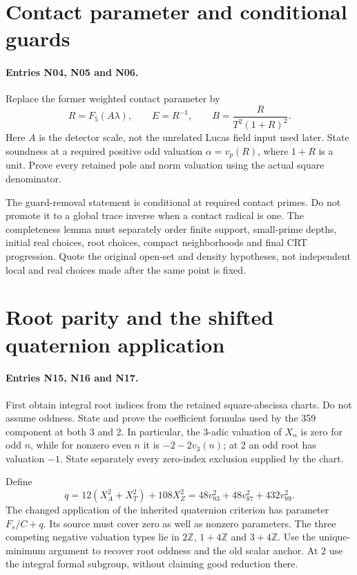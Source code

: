 \documentclass{article}
\begin{document}
\section{Contact parameter and conditional guards}
\label{outline:contact}
\paragraph{Entries N04, N05 and N06.}
Replace the former weighted contact parameter by
\[
 R=F_5(A\lambda),\qquad E=R^{-1},\qquad
 B=\frac{R}{T^2(1+R)^2}.
\]
Here $A$ is the detector scale, not the unrelated Lucas field input
used later. State soundness at a required positive odd valuation
$\alpha=v_p(R)$, where $1+R$ is a unit. Prove every retained pole and
norm valuation using the actual square denominator.

The guard-removal statement is conditional at required contact primes.
Do not promote it to a global trace inverse when a contact radical is one.
The completeness lemma must separately order finite support, small-prime
depths, initial real choices, root choices, compact neighborhoods and final
CRT progression. Quote the original open-set and density hypotheses,
not independent local and real choices made after the same point is fixed.

\section{Root parity and the shifted quaternion application}
\label{outline:anchor}
\paragraph{Entries N15, N16 and N17.}
First obtain integral root indices from the retained square-abscissa charts.
Do not assume oddness. State and prove the coefficient formulas used by
the 359 component at both 3 and 2. In particular, the 3-adic valuation
of $X_n$ is zero for odd $n$, while for nonzero even $n$ it is
$-2-2v_3(n)$; at 2 an odd root has valuation $-1$.
State separately every zero-index exclusion supplied by the chart.

Define
\[
 q=12(X_A^2+X_T^2)+108X_Z^2
   =48v_{83}^2+48v_{87}^2+432v_{89}^2.
\]
The changed application of the inherited quaternion criterion has
parameter $F_s/C+q$. Its source must cover zero as well as nonzero
parameters. The three competing negative valuation types lie in
$2\mathbb Z$, $1+4\mathbb Z$ and $3+4\mathbb Z$.
Use the unique-minimum argument to recover root oddness and the old
scalar anchor. At 2 use the integral formal subgroup, without claiming
good reduction there.
\end{document}
